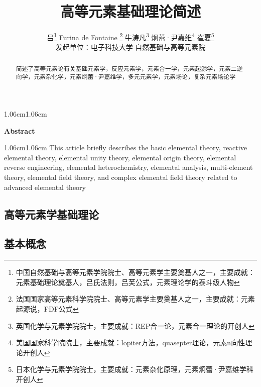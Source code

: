 \documentclass[12pt,a4paper]{article}%
\title{\fontsize{18pt}{27pt}\selectfont%
	{\heiti%
		高等元素基础理论简述}}%
\author{\fontsize{12pt}{18pt}\selectfont%
	{\fangsong%
		吕\thanks{中国自然基础与高等元素学院院士、高等元素学主要奠基人之一，主要成就：元素基础理论奠基人，吕氏法则，吕芙公式，元素理论学的泰斗级人物}
		 \quad  Furina de Fontaine}	\thanks{法国国家高等元素科学院院士、高等元素学主要奠基人之一，主要成就：元素起源说，FDF公式}
		  \quad 牛涛凡\thanks{英国化学与元素学院院士，主要成就：REP合一论，元素合一理论的开创人}
			\quad 炯蕾·尹嘉维\thanks{美国国家科学院院士，主要成就：lopiter方法，quasepter理论，元素n向性理论开创人}
			\quad 崔夏\thanks{日本化学与元素学院院士，主要成就：元素杂化原理，元素炯蕾·尹嘉维学科开创人}
			\\%
		\fontsize{10.5pt}{15.75pt}\selectfont%
	{\fangsong%
	发起单位：电子科技大学 自然基础与高等元素院}}%
\date{}%
\begin{document}
	\maketitle%
	\lhead{}%
	\chead{}%
	\rhead{}%
	\lfoot{}%
	\cfoot{\thepage}%
	\rfoot{}%
	\begin{abstract}
		\fangsong 简述了高等元素论有关基础元素学，反应元素学，元素合一学，元素起源学，元素二逆向学，元素杂化学，元素炯蕾·尹嘉维学，多元元素学，元素场论，复杂元素场论学
	\end{abstract}
	
	\begin{adjustwidth}{1.06cm}{1.06cm}
		\fontsize{10.5pt}{15.75pt}\\
	\end{adjustwidth}
	
	\begin{center}%
		{\textbf{Abstract}}%
	\end{center}
	\begin{adjustwidth}{1.06cm}{1.06cm}%
		\hspace{1.5em}This article briefly describes the basic elemental theory, reactive elemental theory, elemental unity theory, elemental origin theory, elemental reverse engineering, elemental heterochemistry, elemental analysis, multi-element theory, elemental field theory, and complex elemental field theory related to advanced elemental theory
	\end{adjustwidth}

	\newpage%
\begin{center} 
	\tableofcontents
\end{center}
\setcounter{page}{0}
\thispagestyle{empty}

\newpage%

\begin{center}
		\section{高等元素学基础理论}
		
\end{center}
\subsection{基本概念}
\end{document}
